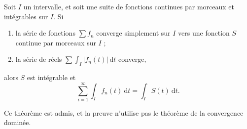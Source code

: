 \begin{thm}
	Soit $I$\/ un intervalle, et soit une suite de fonctions continues par morceaux et intégrables sur $I$. Si
	\begin{enumerate}
		\item la série de fonctions $\sum f_n$\/ converge simplement sur $I$\/ vers une fonction $S$\/ continue par morceaux sur $I$\/ ;
		\item la série de réels $\sum \int_I |f_n(t)|~\mathrm{d}t$\/ converge,
	\end{enumerate}
	alors $S$\/ est intégrable et \[
		\sum_{i=1}^\infty \int_I f_n(t) ~\mathrm{d}t = \int_{I} S(t)~\mathrm{d}t
	.\]
\end{thm}

Ce théorème est admis, et la preuve n'utilise pas le théorème de la convergence dominée.

